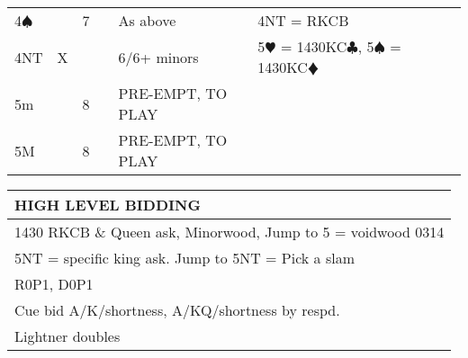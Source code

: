 \documentclass{article}
\newcommand\C{\ensuremath{\clubsuit}}
\newcommand\D{\color{red}\ensuremath{\vardiamondsuit}}
\renewcommand\H{\color{red}\ensuremath{\varheartsuit}}
\renewcommand\S{\ensuremath{\spadesuit}}
\newcommand\N{{\footnotesize NT}}
\begin{document}
\begin{tabular}{| p{9mm} | p{6mm} | p{6mm} | p{6mm} | p{58mm} | p{62mm} | p{58mm} | p{48mm} |}
		& &\\ \hline
	4\S & & 7 & 
		& As above & 4{\N} = RKCB 
		& &\\ \hline
	4\N & X & & 
		& 6/6+ minors 
		& 5{\H} = 1430KC{\C}, 5{\S} = 1430KC{\D}
		& &\\ \hline
	5m & & 8 & & PRE-EMPT, TO PLAY & & & \\ \hline
	5M & & 8 & & PRE-EMPT, TO PLAY & & & \\ \hline
\end{tabular}

\noindent
\begin{tabular}{| p{284mm} |}
	\hline
	\cellcolor{green!25} \textbf{HIGH LEVEL BIDDING}  \\ \hline
	1430 RKCB \& Queen ask, Minorwood, Jump to 5 = voidwood 0314\\ \hline
	5NT = specific king ask. Jump to 5NT = Pick a slam\\ \hline
	R0P1, D0P1 \\ \hline
	Cue bid A/K/shortness, A/KQ/shortness by respd. \\ \hline
	Lightner doubles  \\ \hline

\end{tabular}

\end{document}
